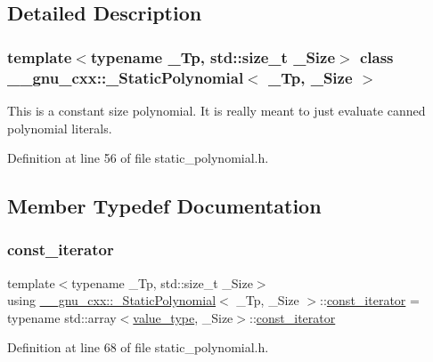\subsection{Detailed Description}
\subsubsection*{template$<$typename \+\_\+\+Tp, std\+::size\+\_\+t \+\_\+\+Size$>$\newline
class \+\_\+\+\_\+gnu\+\_\+cxx\+::\+\_\+\+Static\+Polynomial$<$ \+\_\+\+Tp, \+\_\+\+Size $>$}

This is a constant size polynomial. It is really meant to just evaluate canned polynomial literals. 

Definition at line 56 of file static\+\_\+polynomial.\+h.



\subsection{Member Typedef Documentation}
\mbox{\label{class____gnu__cxx_1_1__StaticPolynomial_a2e806a3a61788a2fad49adf67725ae7e}} 
\subsubsection{\texorpdfstring{const\+\_\+iterator}{const\_iterator}}
{\footnotesize\ttfamily template$<$typename \+\_\+\+Tp, std\+::size\+\_\+t \+\_\+\+Size$>$ \\
using \hyperlink{class____gnu__cxx_1_1__StaticPolynomial}{\+\_\+\+\_\+gnu\+\_\+cxx\+::\+\_\+\+Static\+Polynomial}$<$ \+\_\+\+Tp, \+\_\+\+Size $>$\+::\hyperlink{class____gnu__cxx_1_1__StaticPolynomial_a2e806a3a61788a2fad49adf67725ae7e}{const\+\_\+iterator} =  typename std\+::array$<$\hyperlink{class____gnu__cxx_1_1__StaticPolynomial_aad5f3d6d5876b6926b30724aeac649d6}{value\+\_\+type}, \+\_\+\+Size$>$\+::\hyperlink{class____gnu__cxx_1_1__StaticPolynomial_a2e806a3a61788a2fad49adf67725ae7e}{const\+\_\+iterator}}



Definition at line 68 of file static\+\_\+polynomial.\+h.

